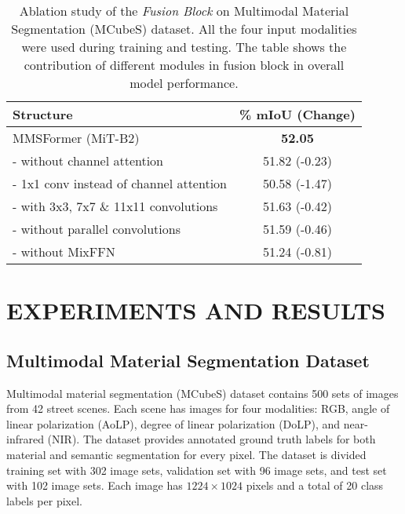\documentclass{article}
\begin{document}
\begin{table}[th]
\centering
\caption{Ablation study of the {\it Fusion Block} on Multimodal Material Segmentation (MCubeS) \cite{Liang2022MCubeS} dataset. All the four input modalities were used during training and testing. The table shows the contribution of different modules in fusion block in overall model performance.}
\setlength{\tabcolsep}{1pt}
\begin{tabular}{lc}
    \toprule
    Structure                                            & \% mIoU (Change) \\
    \midrule
    \midrule 
    MMSFormer (MiT-B2)                                   & \textbf{52.05}\\
    \midrule
    \hspace{3mm} - without channel attention             & 51.82 {\footnotesize \color{red} (-0.23)} \\
    \hspace{3mm} - 1x1 conv instead of channel attention & 50.58 {\footnotesize \color{red} (-1.47)} \\
    \hspace{3mm} - with 3x3, 7x7 \& 11x11 convolutions   & 51.63 {\footnotesize \color{red} (-0.42)} \\
    \hspace{3mm} - without parallel convolutions         & 51.59 {\footnotesize \color{red} (-0.46)} \\
    \hspace{3mm} - without MixFFN                        & 51.24 {\footnotesize \color{red} (-0.81)} \\
    \bottomrule
\end{tabular}
\label{tab:fusion-block-ablation-study}
\end{table} 


\section{EXPERIMENTS AND RESULTS}
\label{sec:experiment}
\subsection{Multimodal Material Segmentation Dataset}
Multimodal material segmentation (MCubeS) dataset 
\cite{Liang2022MCubeS} contains 500 sets of images from 42 street scenes. Each scene has images for four modalities: RGB, angle of linear polarization (AoLP), degree of linear polarization (DoLP), and near-infrared (NIR). The dataset provides annotated ground truth labels for both material and semantic segmentation for every pixel. The dataset is divided training set with 302 image sets, validation set with 96 image sets, and test set with 102 image sets. Each image has  $1224\times 1024$ pixels and a total of 20 class labels per pixel. 
\end{document}
